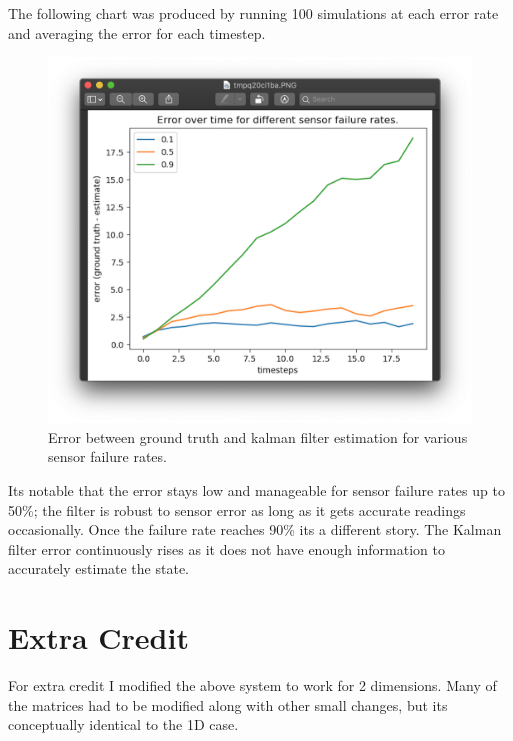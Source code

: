 \documentclass{article}
\begin{document}
The following chart was produced by running 100 simulations at each error rate and averaging the error for each timestep. 

\begin{figure}[h]
    \includegraphics[width=12cm]{error_rates.png}
    \centering
    \caption{Error between ground truth and kalman filter estimation for various sensor failure rates.}
\end{figure} 

Its notable that the error stays low and manageable for sensor failure rates up to 50\%; the filter is robust to sensor error as long as it gets accurate readings occasionally. Once the failure rate reaches 90\% its a different story. The Kalman filter error continuously rises as it does not have enough information to accurately estimate the state.  \\

\section{Extra Credit}

For extra credit I modified the above system to work for 2 dimensions. Many of the matrices had to be modified along with other small changes, but its conceptually identical to the 1D case.
\end{document}
